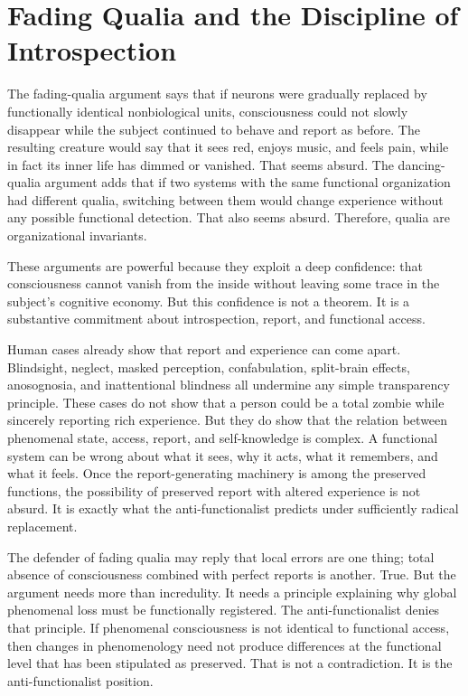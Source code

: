 \documentclass[11pt]{article}
\begin{document}
\section{Fading Qualia and the Discipline of Introspection}

The fading-qualia argument says that if neurons were gradually replaced by functionally identical nonbiological units, consciousness could not slowly disappear while the subject continued to behave and report as before. The resulting creature would say that it sees red, enjoys music, and feels pain, while in fact its inner life has dimmed or vanished. That seems absurd. The dancing-qualia argument adds that if two systems with the same functional organization had different qualia, switching between them would change experience without any possible functional detection. That also seems absurd. Therefore, qualia are organizational invariants.

These arguments are powerful because they exploit a deep confidence: that consciousness cannot vanish from the inside without leaving some trace in the subject's cognitive economy. But this confidence is not a theorem. It is a substantive commitment about introspection, report, and functional access.

Human cases already show that report and experience can come apart. Blindsight, neglect, masked perception, confabulation, split-brain effects, anosognosia, and inattentional blindness all undermine any simple transparency principle. These cases do not show that a person could be a total zombie while sincerely reporting rich experience. But they do show that the relation between phenomenal state, access, report, and self-knowledge is complex. A functional system can be wrong about what it sees, why it acts, what it remembers, and what it feels. Once the report-generating machinery is among the preserved functions, the possibility of preserved report with altered experience is not absurd. It is exactly what the anti-functionalist predicts under sufficiently radical replacement.

The defender of fading qualia may reply that local errors are one thing; total absence of consciousness combined with perfect reports is another. True. But the argument needs more than incredulity. It needs a principle explaining why global phenomenal loss must be functionally registered. The anti-functionalist denies that principle. If phenomenal consciousness is not identical to functional access, then changes in phenomenology need not produce differences at the functional level that has been stipulated as preserved. That is not a contradiction. It is the anti-functionalist position.
\end{document}
